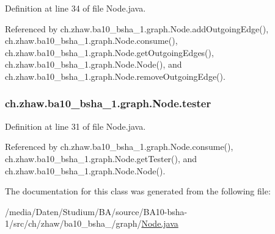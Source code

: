 Definition at line 34 of file Node.java.

Referenced by ch.zhaw.ba10\_\-bsha\_\-1.graph.Node.addOutgoingEdge(), ch.zhaw.ba10\_\-bsha\_\-1.graph.Node.consume(), ch.zhaw.ba10\_\-bsha\_\-1.graph.Node.getOutgoingEdges(), ch.zhaw.ba10\_\-bsha\_\-1.graph.Node.Node(), and ch.zhaw.ba10\_\-bsha\_\-1.graph.Node.removeOutgoingEdge().\hypertarget{classch_1_1zhaw_1_1ba10__bsha__1_1_1graph_1_1Node_abec03ba4df889f23c0d30d70edee59f6}{
\subsubsection[{tester}]{ {\bf ch.zhaw.ba10\_\-bsha\_\-1.graph.Node.tester}}}
\label{classch_1_1zhaw_1_1ba10__bsha__1_1_1graph_1_1Node_abec03ba4df889f23c0d30d70edee59f6}


Definition at line 31 of file Node.java.

Referenced by ch.zhaw.ba10\_\-bsha\_\-1.graph.Node.consume(), ch.zhaw.ba10\_\-bsha\_\-1.graph.Node.getTester(), and ch.zhaw.ba10\_\-bsha\_\-1.graph.Node.Node().

The documentation for this class was generated from the following file:\begin{DoxyCompactItemize}
\item 
/media/Daten/Studium/BA/source/BA10-\/bsha-\/1/src/ch/zhaw/ba10\_\-bsha\_/graph/\hyperlink{Node_8java}{Node.java}\end{DoxyCompactItemize}
